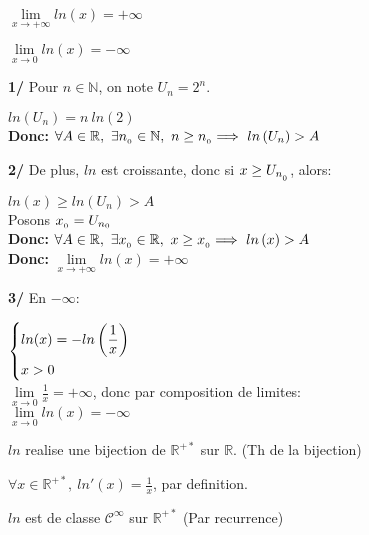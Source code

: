 \documentclass[12pt,twoside,a4paper]{article}
\begin{document}
	\begin{prop}
		\begin{liste}
			\item $\lim\limits_{x\rightarrow+\infty}ln(x)=+\infty$
			\item $\lim\limits_{x\rightarrow0}ln(x)=-\infty$
		\end{liste}
	\end{prop}
	\begin{preuve}
		\textbf{1/} Pour $n\in\mathbb{N}$, on note $U_n=2^n$.
		\begin{tab}\begin{tab}
			$ln\left(U_n\right)=n\ ln(2)$\\
			\textbf{Donc: }$\forall A\in\mathbb{R},\ \exists n_{_{0}}\in\mathbb{N},\ n\geq n_{_{0}} \Longrightarrow\ ln\left(U_n\right)>A$\\
		\end{tab}\end{tab}
		\textbf{2/} De plus, $ln$ est croissante, donc si $x\geq U_{n_{_{0}}}$, alors:
		\begin{tab}\begin{tab}
			$ln(x)\geq ln\left(U_n\right)>A$ \\
			Posons $x_{_{0}}=U_{n_0}$\\
			\textbf{Donc: }$\forall A\in\mathbb{R},\ \exists x_{_{0}}\in\mathbb{R},\ x\geq x_{_{0}} \Longrightarrow\ ln\left(x\right)>A$\\
			\textbf{Donc: }$\lim\limits_{x\rightarrow+\infty}ln(x)=+\infty$\\
		\end{tab}\end{tab}
		\textbf{3/} En $-\infty$:
		\begin{tab}\begin{tab}
			$\left\{\begin{aligned}&ln(x)=-ln\left(\frac{1}{x}\right)\\&x>0\end{aligned}\right.$\\
			$\lim\limits_{x\rightarrow0}\frac{1}{x}=+\infty$, donc par composition de limites:\\
			$\lim\limits_{x\rightarrow0}ln(x)=-\infty$
		\end{tab}\end{tab}
	\end{preuve}
	\begin{prop}
		\begin{liste}
			\item $ln$ realise une bijection de $\mathbb{R}^{+*}$ sur $\mathbb{R}$.  (Th de la bijection)
			\item $\forall x\in\mathbb{R}^{+*},\ ln'(x)=\frac{1}{x}$, par definition.
			\item $ln$ est de classe $\mathscr{C}^\infty$ sur $\mathbb{R}^{+*}$ (Par recurrence)
		\end{liste}
	\end{prop}
\pagebreak
\end{document}
